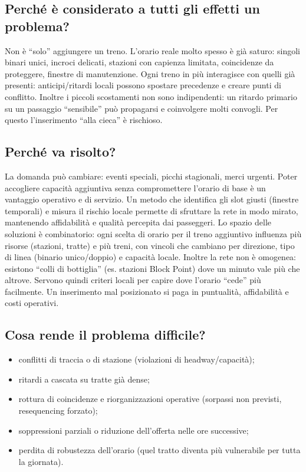 \documentclass[a4paper,12pt]{report}
\begin{document}
\subsection{Perché è considerato a tutti gli effetti un problema?}
Non è “solo” aggiungere un treno.
L’orario reale molto spesso è già saturo: singoli binari unici, incroci delicati, stazioni con capienza limitata, coincidenze da proteggere, finestre di manutenzione. Ogni treno in più interagisce con quelli già presenti: anticipi/ritardi locali possono spostare precedenze e creare punti di conflitto. Inoltre i piccoli scostamenti non sono indipendenti: un ritardo primario su un passaggio “sensibile” può propagarsi e coinvolgere molti convogli. Per questo l’inserimento “alla cieca” è rischioso.



\subsection{Perché va risolto?}
La domanda può cambiare: eventi speciali, picchi stagionali, merci urgenti. Poter accogliere capacità aggiuntiva senza compromettere l’orario di base è un vantaggio operativo e di servizio. Un metodo che identifica gli slot giusti (finestre temporali) e misura il rischio locale permette di sfruttare la rete in modo mirato, mantenendo affidabilità e qualità percepita dai passeggeri.
Lo spazio delle soluzioni è combinatorio: ogni scelta di orario per il treno aggiuntivo influenza più risorse (stazioni, tratte) e più treni, con vincoli che cambiano per direzione, tipo di linea (binario unico/doppio) e capacità locale. Inoltre la rete non è omogenea: esistono “colli di bottiglia” (es. stazioni Block Point) dove un minuto vale più che altrove. Servono quindi criteri locali per capire dove l’orario “cede” più facilmente.
Un inserimento mal posizionato si paga in puntualità, affidabilità e costi operativi.


\subsection{Cosa rende il problema difficile?}
\begin{itemize}
\item conflitti di traccia o di stazione (violazioni di headway/capacità);

\item ritardi a cascata su tratte già dense;

\item rottura di coincidenze e riorganizzazioni operative (sorpassi non previsti, resequencing forzato);

\item soppressioni parziali o riduzione dell’offerta nelle ore successive;

\item perdita di robustezza dell’orario (quel tratto diventa più vulnerabile per tutta la giornata).
\end{itemize}
\end{document}
